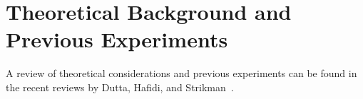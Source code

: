\chapter{Theoretical Background and Previous Experiments}





A review of theoretical considerations and previous experiments can be found in
the recent reviews by Dutta, Hafidi, and Strikman~\cite{Dutta_2013,Dutta_2012}.
